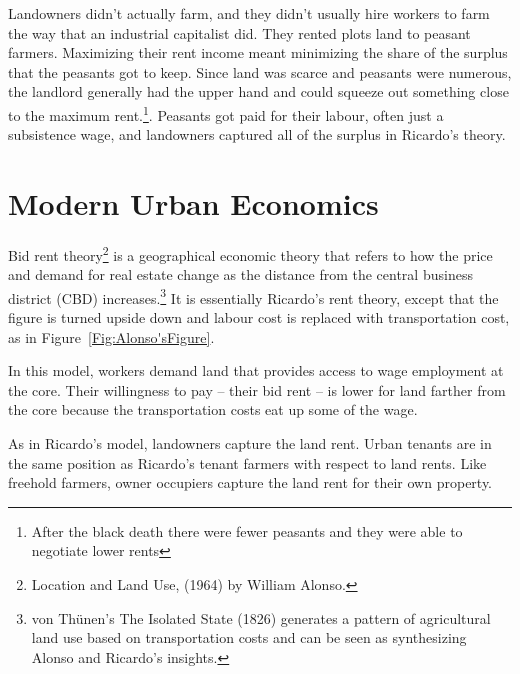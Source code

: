 Landowners didn't actually farm, and they didn't usually hire workers to farm the way that an industrial capitalist did. They rented plots land to peasant farmers.  Maximizing their rent  income meant minimizing the share of the surplus that the peasants got to keep. Since land was scarce and peasants were numerous, the landlord generally had the upper hand and could squeeze out something close to the maximum rent.\footnote{After the black death there were fewer peasants  and they were able to negotiate lower rents}. Peasants got paid for their labour, often just a subsistence wage, and landowners captured all of the surplus in Ricardo's theory.


\section{Modern Urban Economics}
Bid rent theory\footnote{Location and Land Use, (1964) by William Alonso.} is a geographical economic theory that refers to how the price and demand for real estate change as the distance from the central business district (CBD) increases.\footnote{von Th\"unen's The Isolated State (1826) generates a pattern of agricultural land use based on transportation costs and can be seen as synthesizing Alonso and Ricardo's insights. } It is essentially Ricardo's rent theory, except that the figure is turned upside down and labour cost  is replaced with transportation cost, as in Figure~\ref{Fig:Alonso'sFigure}. 

In this model, workers demand land that provides access to wage employment at the core. Their willingness to pay -- their bid rent -- is lower for land farther from the core because the transportation costs eat up some of the wage. 

As in Ricardo's model, landowners capture the land rent.  Urban tenants are in the same position as Ricardo's tenant farmers with respect to land rents. Like freehold farmers, owner occupiers capture the land rent  for their own property.



